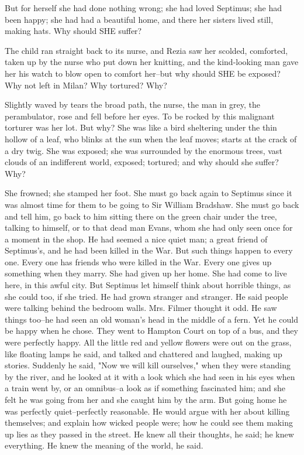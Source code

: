 \documentclass[lang=cn,10pt]{elegantbook}
\begin{document}
But for herself she had done nothing wrong; she had loved Septimus;
she had been happy; she had had a beautiful home, and there her
sisters lived still, making hats.  Why should SHE suffer?

The child ran straight back to its nurse, and Rezia saw her
scolded, comforted, taken up by the nurse who put down her
knitting, and the kind-looking man gave her his watch to blow open
to comfort her--but why should SHE be exposed?  Why not left in
Milan?  Why tortured?  Why?

Slightly waved by tears the broad path, the nurse, the man in grey,
the perambulator, rose and fell before her eyes.  To be rocked by
this malignant torturer was her lot.  But why?  She was like a bird
sheltering under the thin hollow of a leaf, who blinks at the sun
when the leaf moves; starts at the crack of a dry twig.  She was
exposed; she was surrounded by the enormous trees, vast clouds of
an indifferent world, exposed; tortured; and why should she suffer?
Why?

She frowned; she stamped her foot.  She must go back again to
Septimus since it was almost time for them to be going to Sir
William Bradshaw.  She must go back and tell him, go back to him
sitting there on the green chair under the tree, talking to
himself, or to that dead man Evans, whom she had only seen once for
a moment in the shop.  He had seemed a nice quiet man; a great
friend of Septimus's, and he had been killed in the War.  But such
things happen to every one.  Every one has friends who were killed
in the War.  Every one gives up something when they marry.  She had
given up her home.  She had come to live here, in this awful city.
But Septimus let himself think about horrible things, as she could
too, if she tried.  He had grown stranger and stranger.  He said
people were talking behind the bedroom walls.  Mrs. Filmer thought
it odd.  He saw things too--he had seen an old woman's head in the
middle of a fern.  Yet he could be happy when he chose.  They went
to Hampton Court on top of a bus, and they were perfectly happy.
All the little red and yellow flowers were out on the grass, like
floating lamps he said, and talked and chattered and laughed,
making up stories.  Suddenly he said, "Now we will kill ourselves,"
when they were standing by the river, and he looked at it with a
look which she had seen in his eyes when a train went by, or an
omnibus--a look as if something fascinated him; and she felt he was
going from her and she caught him by the arm.  But going home he
was perfectly quiet--perfectly reasonable.  He would argue with her
about killing themselves; and explain how wicked people were; how
he could see them making up lies as they passed in the street.  He
knew all their thoughts, he said; he knew everything.  He knew the
meaning of the world, he said.
\end{document}
